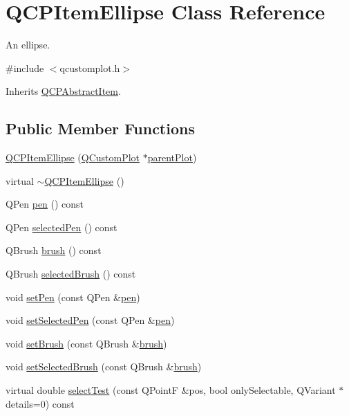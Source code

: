 \hypertarget{class_q_c_p_item_ellipse}{\section{Q\-C\-P\-Item\-Ellipse Class Reference}
\label{class_q_c_p_item_ellipse}
}


An ellipse.  




{\ttfamily \#include $<$qcustomplot.\-h$>$}



Inherits \hyperlink{class_q_c_p_abstract_item}{Q\-C\-P\-Abstract\-Item}.

\subsection*{Public Member Functions}
\begin{DoxyCompactItemize}
\item 
\hyperlink{class_q_c_p_item_ellipse_a759b77ef002515eba0263b5447ecb3fb}{Q\-C\-P\-Item\-Ellipse} (\hyperlink{class_q_custom_plot}{Q\-Custom\-Plot} $\ast$\hyperlink{class_q_c_p_layerable_ab7e0e94461566093d36ffc0f5312b109}{parent\-Plot})
\item 
virtual \hyperlink{class_q_c_p_item_ellipse_a3c17073a1805d32b4e09b6ccde0bef76}{$\sim$\-Q\-C\-P\-Item\-Ellipse} ()
\item 
Q\-Pen \hyperlink{class_q_c_p_item_ellipse_adb67471eabaf1214c99767f1653ca0ed}{pen} () const 
\item 
Q\-Pen \hyperlink{class_q_c_p_item_ellipse_ac52ab52225d238365ff3264b4b69130f}{selected\-Pen} () const 
\item 
Q\-Brush \hyperlink{class_q_c_p_item_ellipse_ac012e4fd59fdb1afb6554937bae8f7e1}{brush} () const 
\item 
Q\-Brush \hyperlink{class_q_c_p_item_ellipse_a0043e401a912d54ea3195bab0967b394}{selected\-Brush} () const 
\item 
void \hyperlink{class_q_c_p_item_ellipse_adb81a663ed2420fcfa011e49f678d1a6}{set\-Pen} (const Q\-Pen \&\hyperlink{class_q_c_p_item_ellipse_adb67471eabaf1214c99767f1653ca0ed}{pen})
\item 
void \hyperlink{class_q_c_p_item_ellipse_a6c542fba1dc918041c583f58a50dde99}{set\-Selected\-Pen} (const Q\-Pen \&\hyperlink{class_q_c_p_item_ellipse_adb67471eabaf1214c99767f1653ca0ed}{pen})
\item 
void \hyperlink{class_q_c_p_item_ellipse_a49fc74e6965834e873d027d026def798}{set\-Brush} (const Q\-Brush \&\hyperlink{class_q_c_p_item_ellipse_ac012e4fd59fdb1afb6554937bae8f7e1}{brush})
\item 
void \hyperlink{class_q_c_p_item_ellipse_a9693501cfaa43a099655c75bed0dab3f}{set\-Selected\-Brush} (const Q\-Brush \&\hyperlink{class_q_c_p_item_ellipse_ac012e4fd59fdb1afb6554937bae8f7e1}{brush})
\item 
virtual double \hyperlink{class_q_c_p_item_ellipse_acd7e5f9528630b2ab5987e2a5782eb7c}{select\-Test} (const Q\-Point\-F \&pos, bool only\-Selectable, Q\-Variant $\ast$details=0) const 
\end{DoxyCompactItemize}
